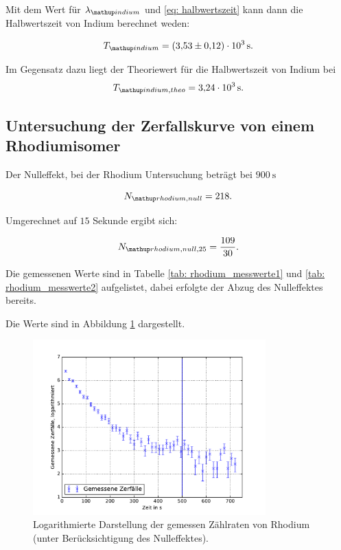 Mit dem Wert für $\lambda\ua{indium}$ und \eqref{eq: halbwertszeit} kann dann die Halbwertszeit von Indium
berechnet weden:

\begin{equation}
  \label{eq:halbwertzeit_indium}
  T\ua{indium}=\SI{3.53\pm0.12 e+3}{\second}.
\end{equation}

Im Gegensatz dazu liegt der Theoriewert für die Halbwertszeit von Indium\cite{indium_halb} bei
\begin{equation}
  \label{eq:halbwertzeit_indium_theo}
  T\ua{indium,theo}=\SI{3.24 e+3}{\second}.
\end{equation}

\subsection{Untersuchung der Zerfallskurve von einem Rhodiumisomer}

Der Nulleffekt, bei der Rhodium Untersuchung beträgt bei $\SI{900}{\second}$

\begin{equation*}
  N\ua{rhodium,null}=218.
\end{equation*}

Umgerechnet auf $15$ Sekunde ergibt sich:

\begin{equation*}
     N\ua{rhodium,null,25}=\frac{109}{30}.
\end{equation*}

Die gemessenen Werte sind in Tabelle \ref{tab: rhodium_messwerte1} und \ref{tab: rhodium_messwerte2} aufgelistet, dabei erfolgte
der Abzug des Nulleffektes bereits.


Die Werte sind in Abbildung \ref{fig: plot_rhodium} dargestellt.

\begin{figure}
  \centering
  \includegraphics[width=0.8\textwidth]{pics/ra_all.pdf}
  \caption{Logarithmierte Darstellung der gemessen Zählraten von Rhodium (unter Berücksichtigung des Nulleffektes).}
  \label{fig: plot_rhodium}
\end{figure}




